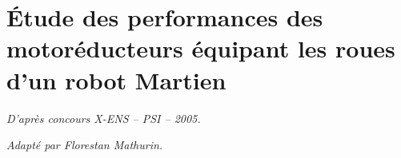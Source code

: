 \documentclass[10pt]{article}
\newif\ifprof
\begin{document}






\begin{comp}
\noindent %
%
%
\end{comp}

\section*{Étude des performances des motoréducteurs équipant les roues d’un robot Martien  }

\begin{flushright}
\textit{D'après concours X-ENS -- PSI -- 2005.}

\textit{Adapté par Florestan Mathurin.}
\end{flushright}

\ifprof
\else
\end{document}
